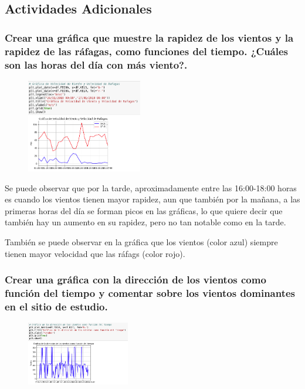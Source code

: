 \documentclass{article} %
\begin{document}
\subsection{Actividades Adicionales}
\subsubsection {Crear una gráfica que muestre la rapidez de los vientos y la rapidez de las ráfagas, como funciones del tiempo. ¿Cuáles son las horas del día con más viento?.}
\begin{figure}
  \centering
  \includegraphics[width=0.45\textwidth]{VelViento.png}
  \label{fig:Actividades}
\end{figure}


Se puede observar que por la tarde, aproximadamente entre las 16:00-18:00 horas es cuando los vientos tienen mayor rapidez, aun que también por la mañana, a las primeras horas del día se forman picos en las gráficas, lo que quiere decir que también hay un aumento en su rapidez, pero no tan notable como en la tarde.

También se puede observar en la gráfica que los vientos (color azul) siempre tienen mayor velocidad que las ráfags (color rojo).


\subsubsection {Crear una gráfica con la dirección de los vientos como función del tiempo y comentar sobre los vientos dominantes en el sitio de estudio.}
\begin{figure}
  \centering
  \includegraphics[width=0.4\textwidth]{Direccion.png}
  \label{fig:Actividades}
\end{figure}
\end{document}

